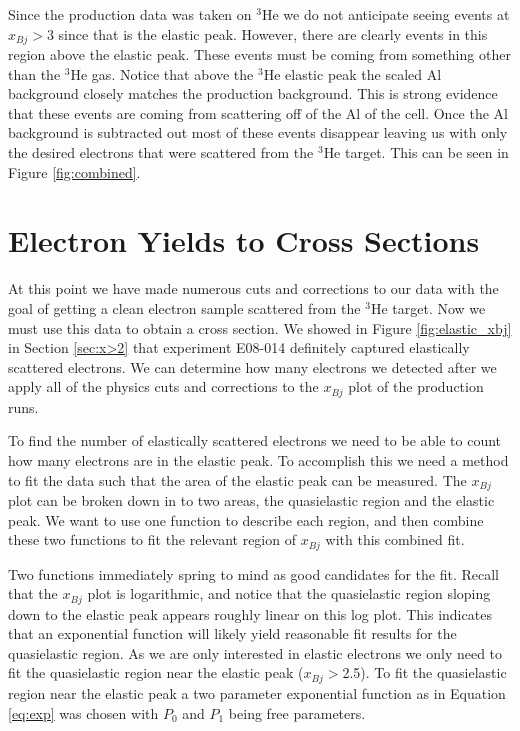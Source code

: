 Since the production data was taken on $^3$He we do not anticipate seeing events at $x_{Bj} > 3$ since that is the elastic peak. However, there are clearly events in this region above the elastic peak. These events must be coming from something other than the $^3$He gas. Notice that above the $^3$He elastic peak the scaled Al background closely matches the production background. This is strong evidence that these events are coming from scattering off of the Al of the cell. Once the Al background is subtracted out most of these events disappear leaving us with only the desired electrons that were scattered from the $^3$He target. This can be seen in Figure \ref{fig:combined}.

\section{Electron Yields to Cross Sections}
\label{sec:yield}

At this point we have made numerous cuts and corrections to our data with the goal of getting a clean electron sample scattered from the $^3$He target. Now we must use this data to obtain a cross section. We showed in Figure \ref{fig:elastic_xbj} in Section \ref{sec:x>2} that experiment E08-014 definitely captured elastically scattered electrons. We can determine how many electrons we detected after we apply all of the physics cuts and corrections to the $x_{Bj}$ plot of the production runs.

To find the number of elastically scattered electrons we need to be able to count how many electrons are in the elastic peak. To accomplish this we need a method to fit the data such that the area of the elastic peak can be measured. The $x_{Bj}$ plot can be broken down in to two areas, the quasielastic region and the elastic peak. We want to use one function to describe each region, and then combine these two functions to fit the relevant region of $x_{Bj}$ with this combined fit. 

Two functions immediately spring to mind as good candidates for the fit. Recall that the $x_{Bj}$ plot is logarithmic, and notice that the quasielastic region sloping down to the elastic peak appears roughly linear on this log plot. This indicates that an exponential function will likely yield reasonable fit results for the quasielastic region. As we are only interested in elastic electrons we only need to fit the quasielastic region near the elastic peak ($x_{Bj}>$2.5). To fit the quasielastic region near the elastic peak a two parameter exponential function as in Equation \ref{eq:exp} was chosen with $P_0$ and $P_1$ being free parameters.

